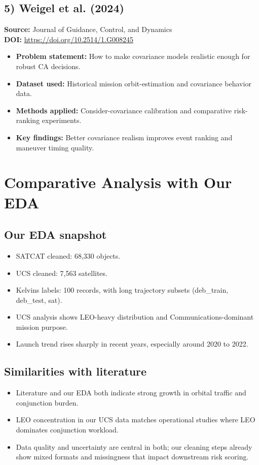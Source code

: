 \documentclass[11pt]{article}
\begin{document}
\subsection*{5) Weigel et al. (2024)}
\textbf{Source:} Journal of Guidance, Control, and Dynamics \\
\textbf{DOI:} \url{https://doi.org/10.2514/1.G008245}
\begin{itemize}[noitemsep]
    \item \textbf{Problem statement:} How to make covariance models realistic enough for robust CA decisions.
    \item \textbf{Dataset used:} Historical mission orbit-estimation and covariance behavior data.
    \item \textbf{Methods applied:} Consider-covariance calibration and comparative risk-ranking experiments.
    \item \textbf{Key findings:} Better covariance realism improves event ranking and maneuver timing quality.
\end{itemize}

\section*{Comparative Analysis with Our EDA}

\subsection*{Our EDA snapshot}
\begin{itemize}[noitemsep]
    \item SATCAT cleaned: 68,330 objects.
    \item UCS cleaned: 7,563 satellites.
    \item Kelvins labels: 100 records, with long trajectory subsets (deb\_train, deb\_test, sat).
    \item UCS analysis shows LEO-heavy distribution and Communications-dominant mission purpose.
    \item Launch trend rises sharply in recent years, especially around 2020 to 2022.
\end{itemize}

\subsection*{Similarities with literature}
\begin{itemize}[noitemsep]
    \item Literature and our EDA both indicate strong growth in orbital traffic and conjunction burden.
    \item LEO concentration in our UCS data matches operational studies where LEO dominates conjunction workload.
    \item Data quality and uncertainty are central in both; our cleaning steps already show mixed formats and missingness that impact downstream risk scoring.
\end{itemize}
\end{document}
